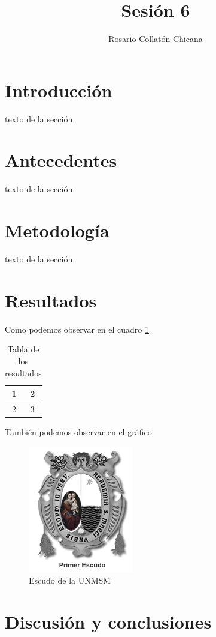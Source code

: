 \documentclass[12pt,a4paper]{article}
\author{Rosario Collatón Chicana}
\title{Sesión 6}
\begin{document}
\maketitle
\tableofcontents
\listoffigures
\listoftables
\section{Introducción}
texto de la sección
\newpage
\section{Antecedentes}
texto de la sección
\newpage
\section{Metodología}
texto de la sección
\newpage
\section{Resultados}
Como podemos observar en el cuadro 
\ref{tab:result}

\begin{table}[h]
\centering
\begin{tabular}{|c|c|}
\hline 
1 & 2 \\ 
\hline 
2 & 3 \\ 
\hline 
\end{tabular} 
\caption{Tabla de los resultados}
\label{tab:result}
\end{table}
\newpage
También podemos observar en el gráfico
\begin{figure}[h]
\centering
\includegraphics[scale=0.5]{UNMSM1}
\caption{Escudo de la UNMSM}
\end{figure}



\section{Discusión y conclusiones}
\end{document}
